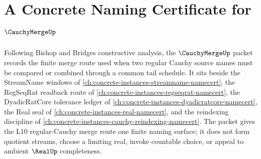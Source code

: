 \chapter{A Concrete Naming Certificate for $\CauchyMergeUp$}
\label{ch:concrete-instances-cauchy-merge-namecert}

Following Bishop and Bridges constructive analysis, the $\CauchyMergeUp$ packet records the finite merge route used when two regular Cauchy source names must be compared or combined through a common tail schedule. It sits beside the StreamName windows of \autoref{ch:concrete-instances-streamname-namecert}, the RegSeqRat readback route of \autoref{ch:concrete-instances-regseqrat-namecert}, the DyadicRatCore tolerance ledger of \autoref{ch:concrete-instances-dyadicratcore-namecert}, the Real seal of \autoref{ch:concrete-instances-real-namecert}, and the reindexing discipline of \autoref{ch:concrete-instances-cauchy-reindexing-namecert}. The packet gives the L10 regular-Cauchy merge route one finite naming surface; it does not form quotient streams, choose a limiting real, invoke countable choice, or appeal to ambient $\RealUp$ completeness.

